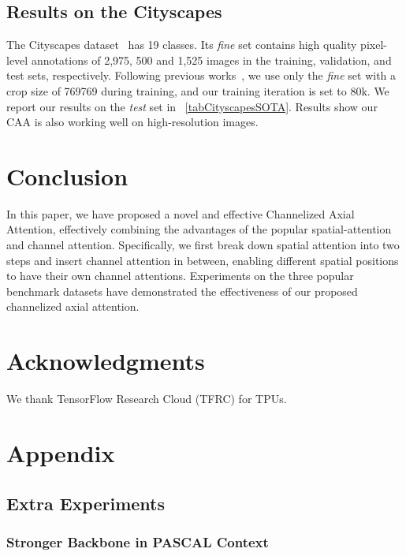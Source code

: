 \documentclass[letterpaper]{article} \usepackage{aaai22}  \usepackage{times}  \usepackage{helvet}  \usepackage{courier}  \usepackage[hyphens]{url}  \usepackage{graphicx} \urlstyle{rm} \def\UrlFont{\rm}  \usepackage{natbib}  \usepackage{caption} \DeclareCaptionStyle{ruled}{labelfont=normalfont,labelsep=colon,strut=off} \frenchspacing  \setlength{\pdfpagewidth}{8.5in}  \setlength{\pdfpageheight}{11in}  \usepackage{algorithm}
\begin{document}
\subsection{Results on the Cityscapes}

The Cityscapes dataset~\cite{cCityScapes} has 19 classes. Its \textit{fine} set contains high quality pixel-level annotations of 2,975, 500 and 1,525 images in the training, validation, and test sets, respectively.
Following previous works~\cite{cDualAttention}, we use only the \textit{fine} set with a crop size of 769769 during training, and our training iteration is set to 80k.
We report our results on the \textit{test} set in \tablename{~\ref{tabCityscapesSOTA}}. Results show our CAA is also working well on high-resolution images.



\section{Conclusion}
\label {secConclusion}

In this paper, we have proposed a novel and effective Channelized Axial Attention, effectively combining the advantages of the popular spatial-attention and channel attention. 
Specifically, we first break down spatial attention into two steps and insert channel attention in between, enabling different spatial positions to have their own channel attentions.
Experiments on the three popular benchmark datasets have demonstrated the effectiveness of our proposed channelized axial attention.

\section{Acknowledgments}
We thank TensorFlow Research Cloud (TFRC)
for TPUs.


\clearpage

\appendix

\section{Appendix}

\subsection{Extra Experiments}
\subsubsection{Stronger Backbone in PASCAL Context}
\end{document}
